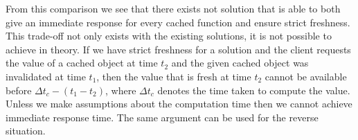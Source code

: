 From this comparison we see that there exists not solution that is able to both give an immediate response for every cached function and ensure strict freshness. This trade-off not only exists with the existing solutions, it is not possible to achieve in theory.
If we have strict freshness for a solution and the client requests the value of a cached object at time $t_2$ and the given cached object was invalidated at time $t_1$, then the value that is fresh at time $t_2$ cannot be available before $\Delta t_c - (t_1 - t_2)$, where $\Delta t_c$ denotes the time taken to compute the value. Unless we make assumptions about the computation time then we cannot achieve immediate response time. The same argument can be used for the reverse situation.


